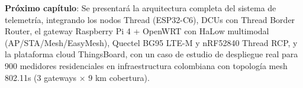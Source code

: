 \textbf{Próximo capítulo}: Se presentará la arquitectura completa del sistema de telemetría, integrando los nodos Thread (ESP32-C6), DCUs con Thread Border Router, el gateway Raspberry Pi 4 + OpenWRT con HaLow multimodal (AP/STA/Mesh/EasyMesh), Quectel BG95 LTE-M y nRF52840 Thread RCP, y la plataforma cloud ThingsBoard, con un caso de estudio de despliegue real para 900 medidores residenciales en infraestructura colombiana con topología mesh 802.11s (3 gateways $\times$ 9 km cobertura).

